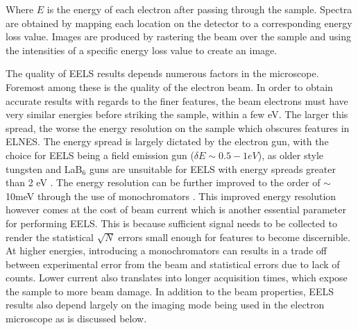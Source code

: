 Where  $E$ is the energy of each electron after passing through the sample.  Spectra are obtained by mapping each location on the detector to a corresponding energy loss value. Images are produced by  rastering the beam over the sample and using the intensities of a specific energy loss value to create an image. 

The quality of EELS results depends numerous factors in the microscope.  Foremost among these is the quality of the electron beam.  In order to obtain accurate results with regards to the finer features, the beam electrons must have very similar energies before striking the sample, within a few eV.  The larger this spread, the worse the energy resolution on the sample which obscures features in ELNES.  The energy spread is largely dictated by the electron gun, with the choice for EELS being a field emission gun ($\delta E \sim 0.5-1eV$), as older style tungsten and LaB$_6$ guns are unsuitable for EELS with energy spreads greater than 2 eV \cite{reimer_transmission_2008}.  The energy resolution can be further improved to the order of $\sim$10meV through the use of monochromators \cite{hachtel_exploring_2018}.  This improved energy resolution however comes at the cost of beam current which is another essential parameter for performing EELS.  This is because sufficient signal needs to be collected to render the statistical $\sqrt{N}$ errors small enough for features to become discernible.  At higher energies, introducing a monochromators can results in a trade off between experimental error from the beam and statistical errors due to lack of counts.  Lower current also translates into longer acquisition times, which expose the sample to more beam damage.  In addition to the beam properties, EELS results also depend largely on the imaging mode being used in the electron microscope as is discussed below.


